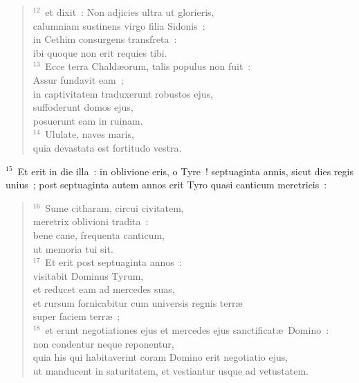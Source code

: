 \begin{verse}
${}^{12}$~et dixit~: Non adjicies ultra ut glorieris,\\ calumniam sustinens virgo filia Sidonis~:\\ in Cethim consurgens transfreta~:\\ ibi quoque non erit requies tibi.\\
${}^{13}$~Ecce terra Chald\ae orum, talis populus non fuit~:\\ Assur fundavit eam~;\\ in captivitatem traduxerunt robustos ejus,\\ suffoderunt domos ejus,\\ posuerunt eam in ruinam.\\
${}^{14}$~Ululate, naves maris,\\ quia devastata est fortitudo vestra.\end{verse}


${}^{15}$~Et erit in die illa~: in oblivione eris, o Tyre~! septuaginta annis, sicut dies regis unius~; post septuaginta autem annos erit Tyro quasi canticum meretricis~:
\begin{verse}${}^{16}$~Sume citharam, circui civitatem,\\ meretrix oblivioni tradita~:\\ bene cane, frequenta canticum,\\ ut memoria tui sit.\\
${}^{17}$~Et erit post septuaginta annos~:\\ visitabit Dominus Tyrum,\\ et reducet eam ad mercedes suas,\\ et rursum fornicabitur cum universis regnis terr\ae \\ super faciem terr\ae~;\\
${}^{18}$~et erunt negotiationes ejus et mercedes ejus sanctificat\ae\ Domino~:\\ non condentur neque reponentur,\\ quia his qui habitaverint coram Domino erit negotiatio ejus,\\ ut manducent in saturitatem, et vestiantur usque ad vetustatem.\end{verse}


